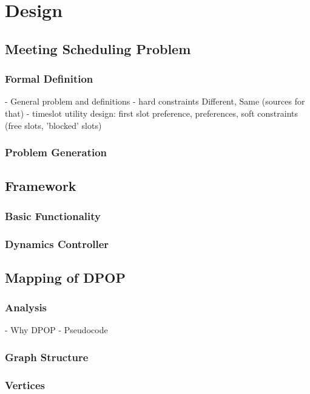 \chapter{Design}

\section{Meeting Scheduling Problem}

\subsection{Formal Definition}

- General problem and definitions
- hard constraints Different, Same (sources for that)
- timeslot utility design: first slot preference, preferences, soft constraints (free slots, 'blocked' slots)

\subsection{Problem Generation}

\section{Framework}
\subsection{Basic Functionality}
\subsection{Dynamics Controller}

\section{Mapping of DPOP}
\subsection{Analysis}
    
    - Why DPOP
    - Pseudocode

\subsection{Graph Structure}
\subsection{Vertices}

